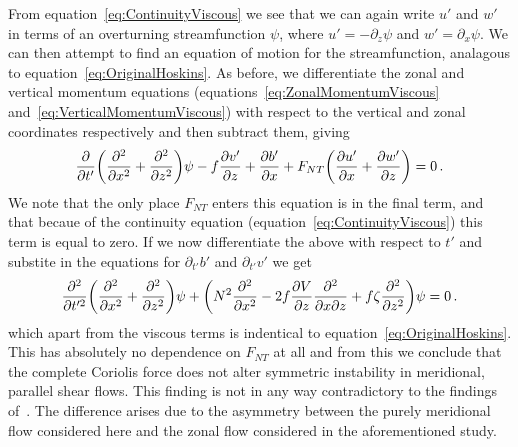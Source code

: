     From equation~\ref{eq:ContinuityViscous} we see that we can again write $u'$ and $w'$ in terms of an overturning streamfunction $\psi$, where $u' = - \partial_z \psi$ and $w' = \partial_x \psi$. We can then attempt to find an equation of motion for the streamfunction, analagous to equation~\ref{eq:OriginalHoskins}. As before, we differentiate the zonal and vertical momentum equations (equations~\ref{eq:ZonalMomentumViscous} and~\ref{eq:VerticalMomentumViscous}) with respect to the vertical and zonal coordinates respectively and then subtract them, giving
    \begin{equation}
        \pdv{}{t'} \bigg( \pdv[2]{x} + \pdv[2]{z} \bigg) \psi - f \pdv{v'}{z} + \pdv{b'}{x} + F_{NT} \bigg( \pdv{u'}{x} + \pdv{w'}{z} \bigg) = 0 \, .
    \end{equation}
    We note that the only place $F_{NT}$ enters this equation is in the final term, and that becaue of the continuity equation (equation~\ref{eq:ContinuityViscous}) this term is equal to zero. If we now differentiate the above with respect to $t'$ and substite in the equations for $\partial_{t'}b'$ and $\partial_{t'}v'$ we get
    \begin{equation}
        \frac{\partial^2}{\partial t'^2} \bigg(\pdv[2]{}{x} + \pdv[2]{}{z}\bigg) \psi + \bigg( N^2 \pdv[2]{}{x} - 2 f \pdv{V}{z} \pdv[2]{}{x}{z} + f \zeta \pdv[2]{}{z} \bigg) \psi = 0 \, .
    \end{equation}
    which apart from the viscous terms is indentical to equation~\ref{eq:OriginalHoskins}\footnotemark. This has absolutely no dependence on $F_{NT}$ at all and from this we conclude that the complete Coriolis force does not alter symmetric instability in meridional, parallel shear flows. This finding is not in any way contradictory to the findings of~\citet{Zeitlin2018a}. The difference arises due to the asymmetry between the purely meridional flow considered here and the zonal flow considered in the aforementioned study.

